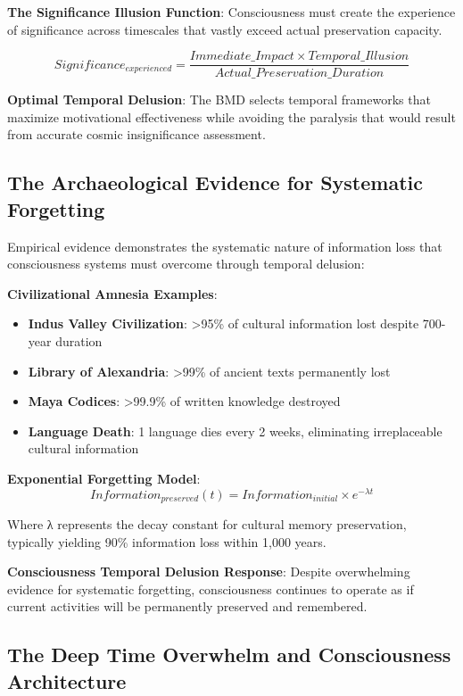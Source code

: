 \documentclass[12pt]{article}
\begin{document}
{\textbf{The Significance Illusion Function}: Consciousness must create the experience of significance across timescales that vastly exceed actual preservation capacity.

$$Significance_{experienced} = \frac{Immediate\_Impact \times Temporal\_Illusion}{Actual\_Preservation\_Duration}$$

\textbf{Optimal Temporal Delusion}: The BMD selects temporal frameworks that maximize motivational effectiveness while avoiding the paralysis that would result from accurate cosmic insignificance assessment.

\subsection{The Archaeological Evidence for Systematic Forgetting}

Empirical evidence demonstrates the systematic nature of information loss that consciousness systems must overcome through temporal delusion:

\textbf{Civilizational Amnesia Examples}:
\begin{itemize}
\item \textbf{Indus Valley Civilization}: >95\% of cultural information lost despite 700-year duration
\item \textbf{Library of Alexandria}: >99\% of ancient texts permanently lost
\item \textbf{Maya Codices}: >99.9\% of written knowledge destroyed
\item \textbf{Language Death}: 1 language dies every 2 weeks, eliminating irreplaceable cultural information
\end{itemize}

\textbf{Exponential Forgetting Model}:
$$Information_{preserved}(t) = Information_{initial} \times e^{-\lambda t}$$

Where λ represents the decay constant for cultural memory preservation, typically yielding 90\% information loss within 1,000 years.

\textbf{Consciousness Temporal Delusion Response}: Despite overwhelming evidence for systematic forgetting, consciousness continues to operate as if current activities will be permanently preserved and remembered.

\subsection{The Deep Time Overwhelm and Consciousness Architecture}

}
\end{document}

